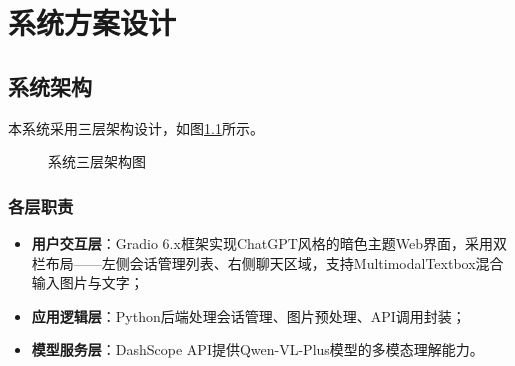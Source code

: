 
\chapter{系统方案设计}
\label{cha:system_design}

\section{系统架构}
\label{sec:architecture}

本系统采用三层架构设计，如图\ref{fig:architecture}所示。

\begin{figure}[htbp]
  \centering
  \caption{系统三层架构图}
  \label{fig:architecture}
\end{figure}

\subsection{各层职责}

\begin{itemize}
  \item \textbf{用户交互层}：Gradio 6.x框架实现ChatGPT风格的暗色主题Web界面，采用双栏布局——左侧会话管理列表、右侧聊天区域，支持MultimodalTextbox混合输入图片与文字；
  \item \textbf{应用逻辑层}：Python后端处理会话管理、图片预处理、API调用封装；
  \item \textbf{模型服务层}：DashScope API提供Qwen-VL-Plus模型的多模态理解能力。
\end{itemize}

